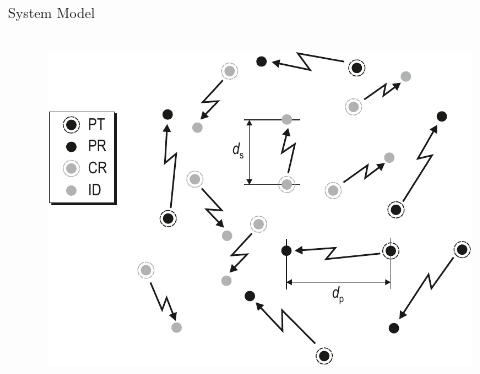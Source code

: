 \documentclass[12pt]{beamer}
\begin{document}
\begin{frame}{System Model}
\begin{columns}
\begin{column}{0.49\paperwidth}
\begin{figure}
        		\includegraphics[trim=0.0cm 0.0cm 0.0cm 0.0cm,clip=true,width=0.4 \paperwidth]{../figures/SGeometry}
			\end{figure}
	\end{column}
	\end{columns}
\end{frame}
\end{document}
